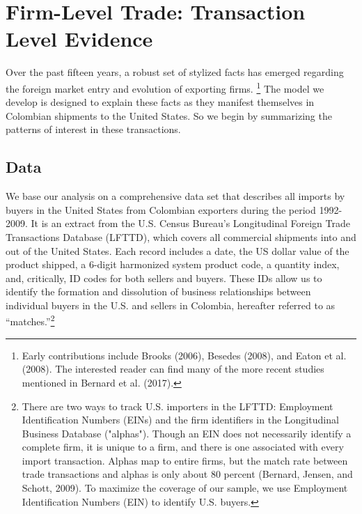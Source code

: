 \documentclass[12pt]{article}
\begin{document}
\section{Firm-Level Trade: Transaction Level Evidence}

Over the past fifteen years, a robust set of stylized facts has emerged
regarding the foreign market entry and evolution of exporting firms.%
\footnote{%
Early contributions include Brooks (2006), Besedes (2008), and Eaton et al. (2008). The
interested reader can find many of the more recent studies mentioned in
Bernard et al. (2017).\medskip} The model we develop is designed to explain these
facts as they manifest themselves in Colombian shipments to the United States. So we begin by summarizing the patterns of interest in these transactions. 

\label{sec:data}
\subsection{Data}

We base our analysis on a comprehensive
data set that describes all imports by buyers in the United States from
Colombian exporters during the period 1992-2009. It is an extract from the
U.S. Census Bureau's Longitudinal Foreign Trade Transactions Database
(LFTTD), which covers all commercial shipments into and out of the United
States. Each record includes a date, the US dollar value of the product
shipped, a 6-digit harmonized system product code, a quantity index, and,
critically, ID codes for both sellers and buyers. These IDs allow us to
identify the formation and dissolution of business relationships between
individual buyers in the U.S. and sellers in Colombia, hereafter referred to
as \textquotedblleft matches.\textquotedblright \footnote{%
There are two ways to track U.S. importers in the LFTTD: Employment
Identification Numbers (EINs) and the firm identifiers in the Longitudinal
Business Database ("alphas"). Though an EIN does not necessarily identify a
complete firm, it is unique to a firm, and there is one associated with
every import transaction. Alphas map to entire firms, but the match rate
between trade transactions and alphas is only about 80 percent (Bernard,
Jensen, and Schott, 2009). To maximize the coverage of our sample, we use
Employment Identification Numbers (EIN) to identify U.S. buyers.\medskip }\ 
\end{document}
